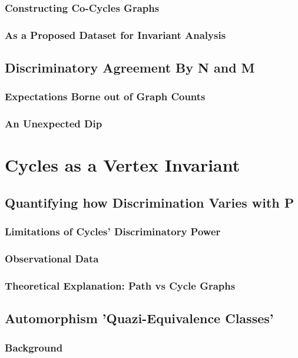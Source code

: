 \documentclass[11pt,a4paper]{report}
\begin{document}
\subsection{Constructing Co-Cycles Graphs}
\subsection{As a Proposed Dataset for Invariant Analysis}

\section{Discriminatory Agreement By N and M}
\subsection{Expectations Borne out of Graph Counts}
\subsection{An Unexpected Dip}




\chapter{Cycles as a Vertex Invariant}

\section{Quantifying how Discrimination Varies with P}
\subsection{Limitations of Cycles' Discriminatory Power}
\subsection{Observational Data}
\subsection{Theoretical Explanation: Path vs Cycle Graphs}

\section{Automorphism 'Quazi-Equivalence Classes'}
\subsection{Background}
\end{document}
